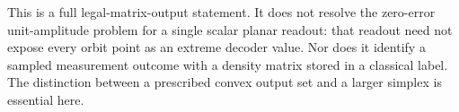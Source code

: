 This is a full legal-matrix-output statement. It does not resolve the
zero-error unit-amplitude problem for a single scalar planar readout:
that readout need not expose every orbit point as an extreme decoder
value. Nor does it identify a sampled measurement outcome with a density
matrix stored in a classical label. The distinction between a prescribed
convex output set and a larger simplex is essential here.
